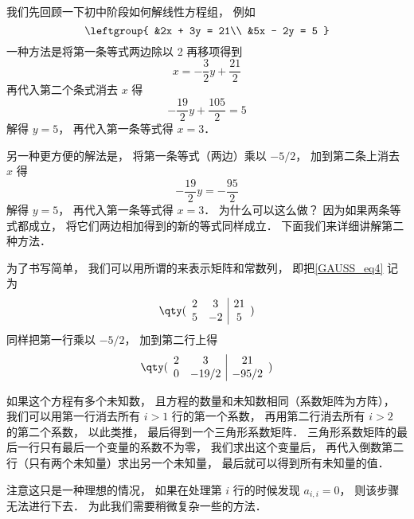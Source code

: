 \begin{exam}{}\label{GAUSS_ex1}
我们先回顾一下初中阶段如何解线性方程组， 例如
\begin{equation}\label{GAUSS_eq4}
\leftgroup{
&2x + 3y = 21\\
&5x - 2y = 5
}\end{equation}
一种方法是将第一条等式两边除以 2 再移项得到
\begin{equation}
x = - \frac32 y + \frac{21}{2}
\end{equation}
再代入第二个条式消去 $x$ 得
\begin{equation}
-\frac{19}{2} y + \frac{105}{2} = 5
\end{equation}
解得 $y = 5$， 再代入第一条等式得 $x = 3$．

另一种更方便的解法是， 将第一条等式（两边）乘以 $-5/2$， 加到第二条上消去 $x$ 得
\begin{equation}
-\frac{19}{2} y = -\frac{95}{2}
\end{equation}
解得 $y = 5$， 再代入第一条等式得 $x = 3$． 为什么可以这么做？ 因为如果两条等式都成立， 将它们两边相加得到的新的等式同样成立． 下面我们来详细讲解第二种方法．

为了书写简单， 我们可以用所谓的来表示矩阵和常数列， 即把\autoref{GAUSS_eq4} 记为
\begin{equation}
\qty( \begin{array}{cc|c}
	2 & 3 & 21 \\
	5 & -2 & 5
	\end{array} 
)\end{equation}
同样把第一行乘以 $-5/2$， 加到第二行上得
\begin{equation}
\qty( \begin{array}{cc|c}
	2 & 3 & 21 \\
	0 & -19/2 & -95/2
	\end{array} 
)\end{equation}

如果这个方程有多个未知数， 且方程的数量和未知数相同（系数矩阵为方阵）， 我们可以用第一行消去所有 $i > 1$ 行的第一个系数， 再用第二行消去所有 $i > 2$ 的第二个系数， 以此类推， 最后得到一个三角形系数矩阵． 三角形系数矩阵的最后一行只有最后一个变量的系数不为零， 我们求出这个变量后， 再代入倒数第二行（只有两个未知量）求出另一个未知量， 最后就可以得到所有未知量的值．

注意这只是一种理想的情况， 如果在处理第 $i$ 行的时候发现 $a_{i,i} = 0$， 则该步骤无法进行下去． 为此我们需要稍微复杂一些的方法．
\end{exam}

